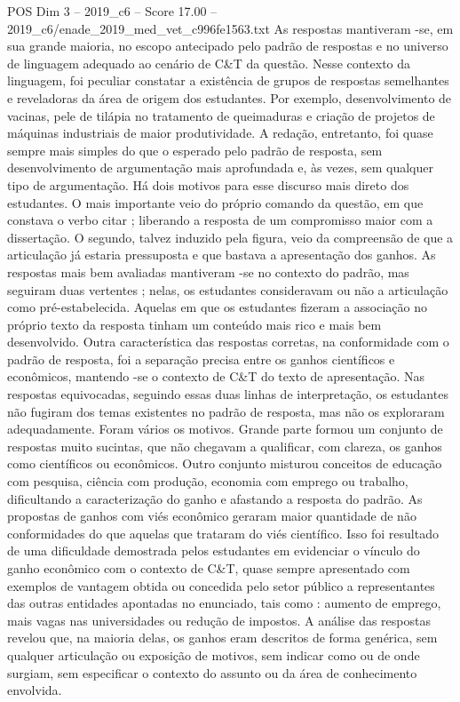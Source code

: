 \begin{textsample}{POS Dim 3 – 2019\_c6 – Score 17.00 – 2019\_c6/enade\_2019\_med\_vet\_c996fe1563.txt}
As respostas mantiveram -se, em sua grande maioria, no escopo antecipado pelo padrão de respostas e no universo de linguagem adequado ao cenário de C\&T da questão.
Nesse contexto da linguagem, foi peculiar constatar a existência de grupos de respostas semelhantes e reveladoras da área de origem dos estudantes.
Por exemplo, desenvolvimento de vacinas, pele de tilápia no tratamento de queimaduras e criação de projetos de máquinas industriais de maior produtividade.
A redação, entretanto, foi quase sempre mais simples do que o esperado pelo padrão de resposta, sem desenvolvimento de argumentação mais aprofundada e, às vezes, sem qualquer tipo de argumentação.
Há dois motivos para esse discurso mais direto dos estudantes.
O mais importante veio do próprio comando da questão, em que constava o verbo citar ; liberando a resposta de um compromisso maior com a dissertação.
O segundo, talvez induzido pela figura, veio da compreensão de que a articulação já estaria pressuposta e que bastava a apresentação dos ganhos.
As respostas mais bem avaliadas mantiveram -se no contexto do padrão, mas seguiram duas vertentes ; nelas, os estudantes consideravam ou não a articulação como pré-estabelecida.
Aquelas em que os estudantes fizeram a associação no próprio texto da resposta tinham um conteúdo mais rico e mais bem desenvolvido.
Outra característica das respostas corretas, na conformidade com o padrão de resposta, foi a separação precisa entre os ganhos científicos e econômicos, mantendo -se o contexto de C\&T do texto de apresentação.
Nas respostas equivocadas, seguindo essas duas linhas de interpretação, os estudantes não fugiram dos temas existentes no padrão de resposta, mas não os exploraram adequadamente.
Foram vários os motivos.
Grande parte formou um conjunto de respostas muito sucintas, que não chegavam a qualificar, com clareza, os ganhos como científicos ou econômicos.
Outro conjunto misturou conceitos de educação com pesquisa, ciência com produção, economia com emprego ou trabalho, dificultando a caracterização do ganho e afastando a resposta do padrão.
As propostas de ganhos com viés econômico geraram maior quantidade de não conformidades do que aquelas que trataram do viés científico.
Isso foi resultado de uma dificuldade demostrada pelos estudantes em evidenciar o vínculo do ganho econômico com o contexto de C\&T, quase sempre apresentado com exemplos de vantagem obtida ou concedida pelo setor público a representantes das outras entidades apontadas no enunciado, tais como : aumento de emprego, mais vagas nas universidades ou redução de impostos.
A análise das respostas revelou que, na maioria delas, os ganhos eram descritos de forma genérica, sem qualquer articulação ou exposição de motivos, sem indicar como ou de onde surgiam, sem especificar o contexto do assunto ou da área de conhecimento envolvida.

\end{textsample}
